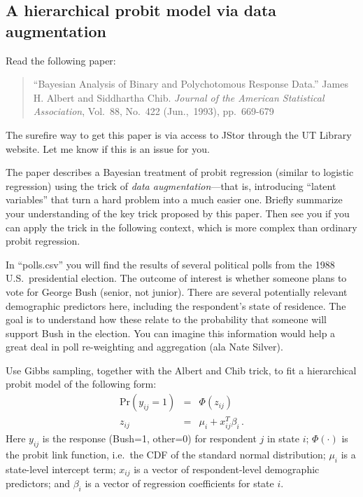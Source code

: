\documentclass{article}
\begin{document}
\subsection{A hierarchical probit model via data augmentation}

Read the following paper:
\begin{quotation}
``Bayesian Analysis of Binary and Polychotomous Response Data.''  James H. Albert and Siddhartha Chib.  \textit{Journal of the American Statistical Association}, Vol.~88, No.~422 (Jun.,~1993), pp.~669-679
\end{quotation}
The surefire way to get this paper is via access to JStor through the UT Library website.  Let me know if this is an issue for you.

The paper describes a Bayesian treatment of probit regression (similar to logistic regression) using the trick of \textit{data augmentation}---that is, introducing ``latent variables'' that turn a hard problem into a much easier one.  Briefly summarize your understanding of the key trick proposed by this paper.  Then see you if you can apply the trick in the following context, which is more complex than ordinary probit regression.

In ``polls.csv'' you will find the results of several political polls from the 1988 U.S.~presidential election.  The outcome of interest is whether someone plans to vote for George Bush (senior, not junior).  There are several potentially relevant demographic predictors here, including the respondent's state of residence.  The goal is to understand how these relate to the probability that someone will support Bush in the election.  You can imagine this information would help a great deal in poll re-weighting and aggregation (ala Nate Silver).

Use Gibbs sampling, together with the Albert and Chib trick, to fit a hierarchical probit model of the following form:
\begin{eqnarray*}
\mbox{Pr}(y_{ij} = 1) &=& \Phi(z_{ij})  \\
z_{ij} &=& \mu_i + x_{ij}^T \beta_i \, .
\end{eqnarray*}
Here $y_{ij}$ is the response (Bush=1, other=0) for respondent $j$ in state $i$; $\Phi(\cdot)$ is the probit link function, i.e.~the CDF of the standard normal distribution; $\mu_i$ is a state-level intercept term; $x_{ij}$ is a vector of respondent-level demographic predictors; and $\beta_i$ is a vector of regression coefficients for state $i$.
\end{document}
